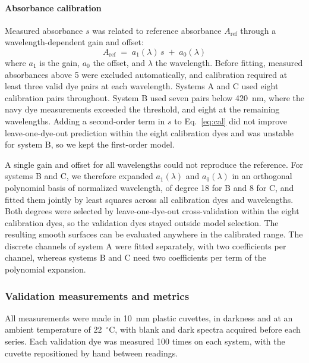 \paragraph{Absorbance calibration}\label{subsubsec2.2.3}

Measured absorbance $s$ was related to reference absorbance $A_{\text{ref}}$ through a wavelength-dependent gain and offset:
\begin{equation}\label{eq:cal}
A_{\text{ref}} \;=\; a_1(\lambda)\, s \;+\; a_0(\lambda)
\end{equation}
where $a_1$ is the gain, $a_0$ the offset, and $\lambda$ the wavelength. Before fitting, measured absorbances above 5 were excluded automatically, and calibration required at least three valid dye pairs at each wavelength. Systems A and C used eight calibration pairs throughout. System B used seven pairs below 420~nm, where the navy dye measurements exceeded the threshold, and eight at the remaining wavelengths. Adding a second-order term in $s$ to Eq.~\ref{eq:cal} did not improve leave-one-dye-out prediction within the eight calibration dyes and was unstable for system B, so we kept the first-order model.

A single gain and offset for all wavelengths could not reproduce the reference. For systems B and C, we therefore expanded $a_1(\lambda)$ and $a_0(\lambda)$ in an orthogonal polynomial basis of normalized wavelength, of degree 18 for B and 8 for C, and fitted them jointly by least squares across all calibration dyes and wavelengths. Both degrees were selected by leave-one-dye-out cross-validation within the eight calibration dyes, so the validation dyes stayed outside model selection. The resulting smooth surfaces can be evaluated anywhere in the calibrated range. The discrete channels of system A were fitted separately, with two coefficients per channel, whereas systems B and C need two coefficients per term of the polynomial expansion.

\subsubsection{Validation measurements and metrics}\label{subsec2.3}

All measurements were made in 10~mm plastic cuvettes, in darkness and at an ambient temperature of 22~$^\circ$C, with blank and dark spectra acquired before each series. Each validation dye was measured 100 times on each system, with the cuvette repositioned by hand between readings.

